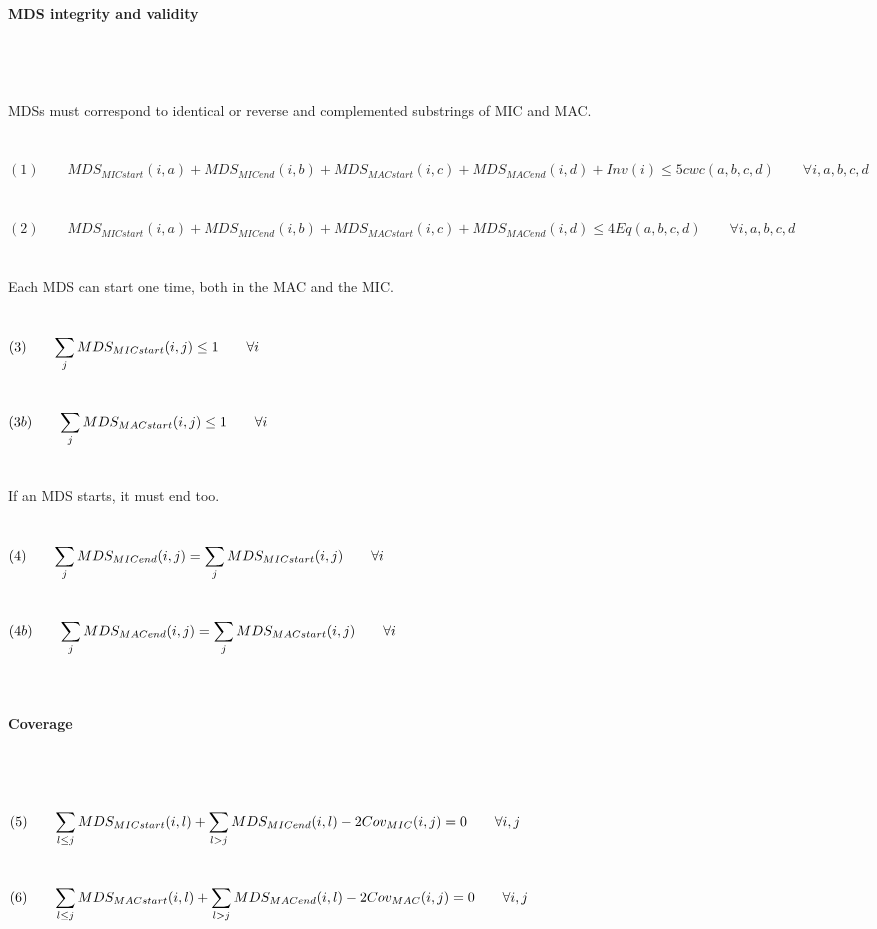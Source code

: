 \paragraph{MDS integrity and validity} $ $ \\\\\\
MDSs must correspond to identical or reverse and complemented substrings of MIC and MAC.
\\\\\\
$(1) \qquad MDS_{MICstart}(i,a) + MDS_{MICend}(i,b) + MDS_{MACstart}(i,c) + MDS_{MACend}(i,d) + Inv(i) \leq 5 cwc(a,b,c,d) \label{eq:someequation} \qquad \forall i,a,b,c,d$ \\\\\\
$(2) \qquad MDS_{MICstart}(i,a) + MDS_{MICend}(i,b) + MDS_{MACstart}(i,c) + MDS_{MACend}(i,d) \leq 4 Eq(a,b,c,d) \qquad \forall i,a,b,c,d $ \\\\\\
Each MDS can start one time, both in the MAC and the MIC. \\\\\\
$(3) \qquad \mathlarger{\sum_{j} MDS_{MICstart}(i,j)\leq 1 \qquad \forall i}$ \\\\\\
$(3b) \qquad \mathlarger{\sum_{j} MDS_{MACstart}(i,j)\leq 1 \qquad \forall i}$ \\\\\\
If an MDS starts, it must end too. \\\\\\
$(4) \qquad \mathlarger{\sum_{j} MDS_{MICend}(i,j) = \sum_{j} MDS_{MICstart}(i,j) \qquad \forall i}$ \\\\\\
$(4b) \qquad \mathlarger{\sum_{j} MDS_{MACend}(i,j) = \sum_{j} MDS_{MACstart}(i,j) \qquad \forall i}$ \\\\\\
\clearpage
\paragraph{Coverage} $ $
\\\\\\
$(5) \qquad \mathlarger{\sum_{l\leq j} MDS_{MICstart}(i,l) + \sum_{l>j}MDS_{MICend}(i,l) - 2Cov_{MIC}(i,j) = 0} \qquad \forall i,j $ \\\\\\
$(6) \qquad \mathlarger{\sum_{l\leq j} MDS_{MACstart}(i,l) + \sum_{l> j}MDS_{MACend}(i,l) - 2Cov_{MAC}(i,j) = 0} \qquad \forall i,j $ \\
